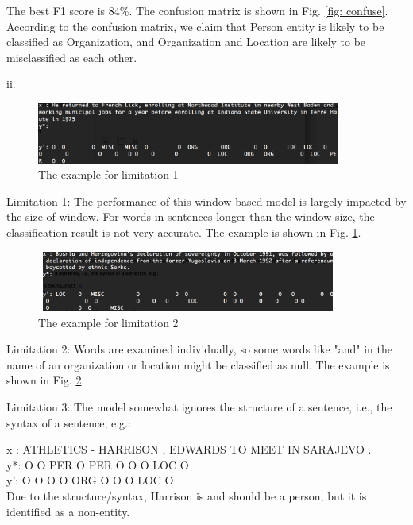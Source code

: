 \documentclass{article}
\theoremstyle{definition}
\theoremstyle{remark}
\numberwithin{equation}{section}
\begin{document}
 The best F1 score is 84\%. The confusion matrix is shown in Fig. \ref{fig: confuse}. According to the confusion matrix, we claim that Person entity is likely to be classified as Organization, and Organization and Location are likely to be misclassified as each other.
 
 ii.
 
  \begin{figure}[H] 
  \centering
 \includegraphics[width=100mm, height=20mm]{fig/eg1.png}
   \caption{The example for limitation 1}
   \label{fig: eg1}
 \end{figure}
 
 Limitation 1: The performance of this window-based model is largely impacted by the size of window. For words in sentences longer than the window size, the classification result is not very accurate. The example is shown in Fig. \ref{fig: eg1}.
 
 
 \begin{figure}[H] 
  \centering
 \includegraphics[width=100mm, height=20mm]{fig/eg2.png}
   \caption{The example for limitation 2}
   \label{fig: eg2}
 \end{figure}
 
 Limitation 2: Words are examined individually, so some words like "and" in the name of an organization or location might be classified as null. The example is shown in Fig. \ref{fig: eg2}.
 
 Limitation 3: The model somewhat ignores the structure of a sentence, i.e., the syntax of a sentence, e.g.:
 
x : ATHLETICS - HARRISON , EDWARDS TO MEET IN SARAJEVO . \\
y*: O         O PER      O PER     O  O    O  LOC      O   \\
y': O         O O        O ORG     O  O    O  LOC      O   \\

Due to the structure/syntax, Harrison is and should be a person, but it is identified as a non-entity. 
\end{document}
